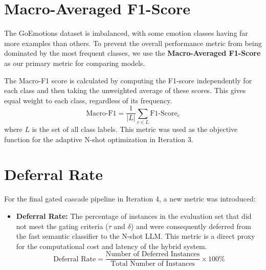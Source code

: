 \section{Macro-Averaged F1-Score}

The GoEmotions dataset is imbalanced, with some emotion classes having far more examples than others. To prevent the overall performance metric from being dominated by the most frequent classes, we use the \textbf{Macro-Averaged F1-Score} as our primary metric for comparing models.

The Macro-F1 score is calculated by computing the F1-score independently for each class and then taking the unweighted average of these scores. This gives equal weight to each class, regardless of its frequency.
\begin{equation}
\text{Macro-F1} = \frac{1}{|L|} \sum_{c \in L} \text{F1-Score}_c
\end{equation}
where $L$ is the set of all class labels. This metric was used as the objective function for the adaptive N-shot optimization in Iteration 3.

\section{Deferral Rate}

For the final gated cascade pipeline in Iteration 4, a new metric was introduced:
\begin{itemize}
    \item \textbf{Deferral Rate:} The percentage of instances in the evaluation set that did not meet the gating criteria ($\tau$ and $\delta$) and were consequently deferred from the fast semantic classifier to the N-shot LLM. This metric is a direct proxy for the computational cost and latency of the hybrid system.
    \begin{equation}
    \text{Deferral Rate} = \frac{\text{Number of Deferred Instances}}{\text{Total Number of Instances}} \times 100\%
    \end{equation}
\end{itemize}